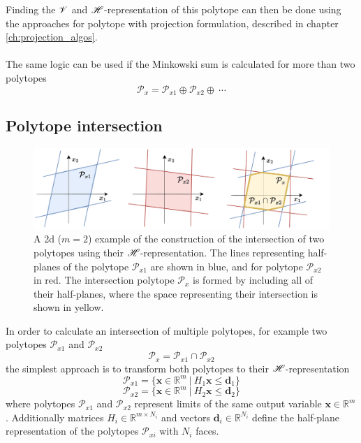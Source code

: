 Finding the $\mathscr{V}$ and $\mathscr{H}$-representation of this polytope can then be done using the approaches  for polytope with projection formulation, described in chapter \ref{ch:projection_algos}.

\paragraph*{} The same logic can be used if the Minkowski sum is calculated for more than two polytopes 
\begin{equation}
    \mathcal{P}_x = \mathcal{P}_{x1} \oplus \mathcal{P}_{x2} \oplus ~\cdots
\end{equation}

\subsection{Polytope intersection}

\begin{figure}[!h]
    \centering
    \includegraphics[width=0.8\linewidth]{Chapters/imgs/polytope_intersection.pdf}
    \caption{A 2d ($m\!=\!2$) example of the construction of the intersection of two polytopes using their $\mathscr{H}$-representation. The lines representing half-planes of the polytope $\mathcal{P}_{x1}$ are shown in blue, and for polytope $\mathcal{P}_{x2}$ in red. The intersection polytope $\mathcal{P}_x$ is formed by including all of their half-planes, where the space representing their intersection is shown in yellow.}
    \label{fig:collab_intesection_solution}
\end{figure}

In order to calculate an intersection of multiple polytopes, for example two polytopes $\mathcal{P}_{x1}$ and $ \mathcal{P}_{x2}$
\begin{equation}
    \mathcal{P}_x = \mathcal{P}_{x1} \cap \mathcal{P}_{x2}
\end{equation}
the simplest approach is to transform both polytopes to their $\mathscr{H}$-representation
\begin{equation}
    \mathcal{P}_{x1} = \{\bm{x}\in\mathbb{R}^m ~|~ H_1\bm{x}\leq \bm{d}_1\}
\end{equation}
\begin{equation}
    \mathcal{P}_{x2} = \{\bm{x}\in\mathbb{R}^m ~|~ H_2\bm{x}\leq \bm{d}_2\}
\end{equation}
where polytopes $\mathcal{P}_{x1}$ and  $\mathcal{P}_{x2}$ represent limits of the same output variable $\bm{x}\in\mathbb{R}^m$. Additionally matrices $H_i\in\mathbb{R}^{m\times N_i}$ and vectors $\bm{d}_i\in\mathbb{R}^{N_i}$ define the half-plane representation of the polytopes $\mathcal{P}_{xi}$ with $N_i$ faces.

